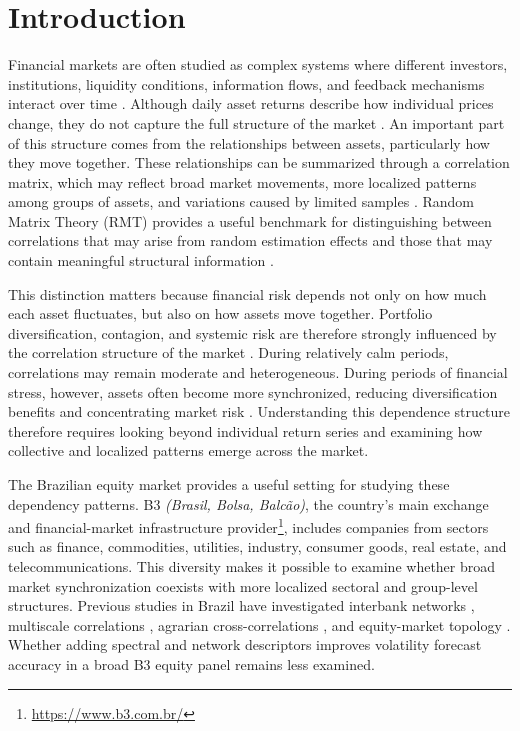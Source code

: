 \section{Introduction}
\label{sec:introduction}

Financial markets are often studied as complex systems where different investors, institutions, liquidity conditions, information flows, and feedback mechanisms interact over time \cite{mantegna_stanley_1999_book}. Although daily asset returns describe how individual prices change, they do not capture the full structure of the market \cite{cont_2001_empirical}. An important part of this structure comes from the relationships between assets, particularly how they move together. These relationships can be summarized through a correlation matrix, which may reflect broad market movements, more localized patterns among groups of assets, and variations caused by limited samples \cite{laloux_1999_noise}. Random Matrix Theory (RMT) provides a useful benchmark for distinguishing between correlations that may arise from random estimation effects and those that may contain meaningful structural information \cite{plerou_2002_random,bun_2017_cleaning}.

This distinction matters because financial risk depends not only on how much each asset fluctuates, but also on how assets move together. Portfolio diversification, contagion, and systemic risk are therefore strongly influenced by the correlation structure of the market \cite{billio_2012_econometric}. During relatively calm periods, correlations may remain moderate and heterogeneous. During periods of financial stress, however, assets often become more synchronized, reducing diversification benefits and concentrating market risk \cite{junior_2012_correlation,zheng_2012_changes}. Understanding this dependence structure therefore requires looking beyond individual return series and examining how collective and localized patterns emerge across the market.

The Brazilian equity market provides a useful setting for studying these dependency patterns. B3 \textit{(Brasil, Bolsa, Balcão)}, the country's main exchange and financial-market infrastructure provider\footnote{\url{https://www.b3.com.br/}}, includes companies from sectors such as finance, commodities, utilities, industry, consumer goods, real estate, and telecommunications. This diversity makes it possible to examine whether broad market synchronization coexists with more localized sectoral and group-level structures. Previous studies in Brazil have investigated interbank networks \cite{tabak_2010_topology}, multiscale correlations \cite{pereira_2019_multiscale}, agrarian cross-correlations \cite{stosic_2015_correlations}, and equity-market topology \cite{leonel_2022_brazilian}. Whether adding spectral and network descriptors improves volatility forecast accuracy in a broad B3 equity panel remains less examined.

